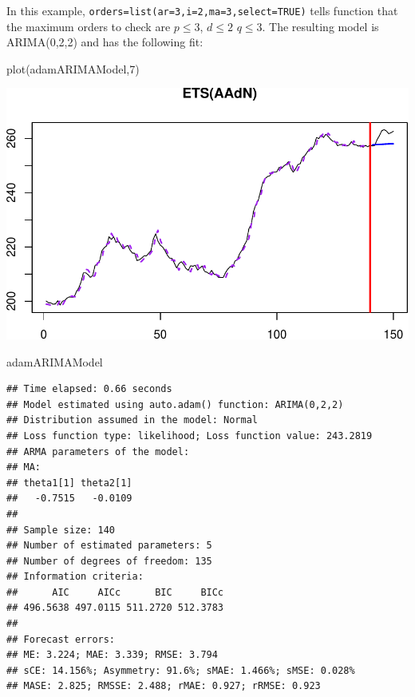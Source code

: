 \documentclass[
]{book}
\newenvironment{Shaded}{\begin{snugshade}}{\end{snugshade}}
\newcommand{\DecValTok}[1]{\textcolor[rgb]{0.00,0.00,0.81}{#1}}
\newcommand{\FunctionTok}[1]{\textcolor[rgb]{0.00,0.00,0.00}{#1}}
\newcommand{\NormalTok}[1]{#1}
\theoremstyle{definition}
\theoremstyle{definition}
\theoremstyle{definition}
\theoremstyle{definition}
\theoremstyle{remark}
\begin{document}
In this example, \texttt{orders=list(ar=3,i=2,ma=3,select=TRUE)} tells function that the maximum orders to check are \(p\leq 3\), \(d\leq 2\) \(q\leq 3\). The resulting model is ARIMA(0,2,2) and has the following fit:

\begin{Shaded}
\begin{Highlighting}[]
\FunctionTok{plot}\NormalTok{(adamARIMAModel,}\DecValTok{7}\NormalTok{)}
\end{Highlighting}
\end{Shaded}

\includegraphics{adam_files/figure-latex/unnamed-chunk-170-1.pdf}

\begin{Shaded}
\begin{Highlighting}[]
\NormalTok{adamARIMAModel}
\end{Highlighting}
\end{Shaded}

\begin{verbatim}
## Time elapsed: 0.66 seconds
## Model estimated using auto.adam() function: ARIMA(0,2,2)
## Distribution assumed in the model: Normal
## Loss function type: likelihood; Loss function value: 243.2819
## ARMA parameters of the model:
## MA:
## theta1[1] theta2[1] 
##   -0.7515   -0.0109 
## 
## Sample size: 140
## Number of estimated parameters: 5
## Number of degrees of freedom: 135
## Information criteria:
##      AIC     AICc      BIC     BICc 
## 496.5638 497.0115 511.2720 512.3783 
## 
## Forecast errors:
## ME: 3.224; MAE: 3.339; RMSE: 3.794
## sCE: 14.156%; Asymmetry: 91.6%; sMAE: 1.466%; sMSE: 0.028%
## MASE: 2.825; RMSSE: 2.488; rMAE: 0.927; rRMSE: 0.923
\end{verbatim}
\end{document}
